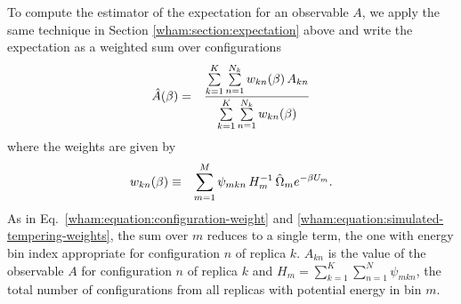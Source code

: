 To compute the estimator of the expectation for an observable $A$, we apply the same technique in Section \ref{wham:section:expectation} above and write the expectation as a weighted sum over configurations
\begin{eqnarray}
\hat{A}(\beta) &=& \frac{\sum\limits_{k=1}^K \sum\limits_{n=1}^{N_k} w_{kn}(\beta) \, A_{kn}}{\sum\limits_{k=1}^K \sum\limits_{n=1}^{N_k} w_{kn}(\beta)} \label{wham:equation:parallel-tempering-estimator}
\end{eqnarray}
where the weights are given by
\begin{eqnarray}
w_{kn}(\beta) &\equiv& \sum_{m=1}^M \psi_{mkn} \, H_m^{-1} \, \hat{\Omega}_m e^{-\beta U_m} . \label{wham:equation:parallel-tempering-weights}
\end{eqnarray}
As in Eq.\ \ref{wham:equation:configuration-weight} and \ref{wham:equation:simulated-tempering-weights}, the sum over $m$ reduces to a single term, the one with energy bin index appropriate for configuration $n$ of replica $k$.  $A_{kn}$ is the value of the observable $A$ for configuration $n$ of replica $k$ and $H_m = \sum_{k=1}^K \sum_{n=1}^N \psi_{mkn}$, the total number of configurations from all replicas with potential energy in bin $m$.


